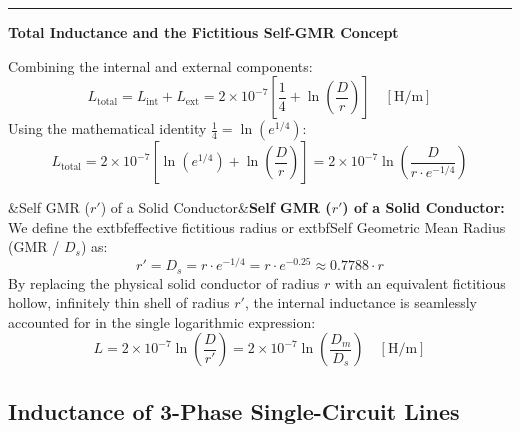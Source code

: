 \documentclass[11pt,a4paper]{article}
\newcommand{\concept}[1]{%
  \vspace{3pt}\noindent\textcolor{AnthGreen}{\rule{3.5pt}{10pt}}\enspace
  \textbf{\sffamily\color{AnthDark}#1}\par\vspace{2pt}%
}
\newenvironment{Def}[1][]{\begin{tcolorbox}[defbox]\ifx&#1&\else\textbf{\color{AnthOrange}#1:}\enspace\fi}{\end{tcolorbox}}
\begin{document}
\concept{Total Inductance and the Fictitious Self-GMR Concept}
Combining the internal and external components:
\begin{equation}
  L_{\text{total}} = L_{\text{int}} + L_{\text{ext}} = 2 \times 10^{-7} \left[ \frac{1}{4} + \ln\left(\frac{D}{r}\right) \right] \quad [\text{H/m}]
\end{equation}
Using the mathematical identity $\frac{1}{4} = \ln(e^{1/4})$:
\begin{equation}
  L_{\text{total}} = 2 \times 10^{-7} \left[ \ln(e^{1/4}) + \ln\left(\frac{D}{r}\right) \right] = 2 \times 10^{-7} \ln\left(\frac{D}{r \cdot e^{-1/4}}\right)
\end{equation}
\begin{Def}[Self GMR ($r'$) of a Solid Conductor]
We define the 	extbf{effective fictitious radius} or 	extbf{Self Geometric Mean Radius (GMR / $D_s$)} as:
\begin{equation}
  r' = D_s = r \cdot e^{-1/4} = r \cdot e^{-0.25} \approx 0.7788 \cdot r
\end{equation}
By replacing the physical solid conductor of radius $r$ with an equivalent fictitious hollow, infinitely thin shell of radius $r'$, the internal inductance is seamlessly accounted for in the single logarithmic expression:
\begin{equation}
  L = 2 \times 10^{-7} \ln\left(\frac{D}{r'}\right) = 2 \times 10^{-7} \ln\left(\frac{D_m}{D_s}\right) \quad [\text{H/m}]
\end{equation}
\end{Def}

\subsection{Inductance of 3-Phase Single-Circuit Lines}
\end{document}

